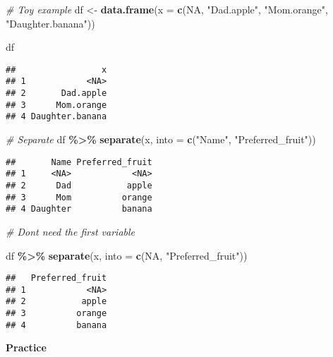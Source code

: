 \documentclass[
]{book}
\newenvironment{Shaded}{\begin{snugshade}}{\end{snugshade}}
\newcommand{\CommentTok}[1]{\textcolor[rgb]{0.56,0.35,0.01}{\textit{#1}}}
\newcommand{\DataTypeTok}[1]{\textcolor[rgb]{0.13,0.29,0.53}{#1}}
\newcommand{\KeywordTok}[1]{\textcolor[rgb]{0.13,0.29,0.53}{\textbf{#1}}}
\newcommand{\NormalTok}[1]{#1}
\newcommand{\OperatorTok}[1]{\textcolor[rgb]{0.81,0.36,0.00}{\textbf{#1}}}
\newcommand{\OtherTok}[1]{\textcolor[rgb]{0.56,0.35,0.01}{#1}}
\newcommand{\StringTok}[1]{\textcolor[rgb]{0.31,0.60,0.02}{#1}}
\begin{document}
\begin{Shaded}
\begin{Highlighting}[]
\CommentTok{\# Toy example}
\NormalTok{df \textless{}{-}}\StringTok{ }\KeywordTok{data.frame}\NormalTok{(}\DataTypeTok{x =} \KeywordTok{c}\NormalTok{(}\OtherTok{NA}\NormalTok{, }\StringTok{"Dad.apple"}\NormalTok{, }\StringTok{"Mom.orange"}\NormalTok{, }\StringTok{"Daughter.banana"}\NormalTok{))}

\NormalTok{df}
\end{Highlighting}
\end{Shaded}

\begin{verbatim}
##                 x
## 1            <NA>
## 2       Dad.apple
## 3      Mom.orange
## 4 Daughter.banana
\end{verbatim}

\begin{Shaded}
\begin{Highlighting}[]
\CommentTok{\# Separate}
\NormalTok{df }\OperatorTok{\%\textgreater{}\%}
\StringTok{  }\KeywordTok{separate}\NormalTok{(x, }\DataTypeTok{into =} \KeywordTok{c}\NormalTok{(}\StringTok{"Name"}\NormalTok{, }\StringTok{"Preferred\_fruit"}\NormalTok{))}
\end{Highlighting}
\end{Shaded}

\begin{verbatim}
##       Name Preferred_fruit
## 1     <NA>            <NA>
## 2      Dad           apple
## 3      Mom          orange
## 4 Daughter          banana
\end{verbatim}

\begin{Shaded}
\begin{Highlighting}[]
\CommentTok{\# Don\textquotesingle{}t need the first variable}

\NormalTok{df }\OperatorTok{\%\textgreater{}\%}
\StringTok{  }\KeywordTok{separate}\NormalTok{(x, }\DataTypeTok{into =} \KeywordTok{c}\NormalTok{(}\OtherTok{NA}\NormalTok{, }\StringTok{"Preferred\_fruit"}\NormalTok{))}
\end{Highlighting}
\end{Shaded}

\begin{verbatim}
##   Preferred_fruit
## 1            <NA>
## 2           apple
## 3          orange
## 4          banana
\end{verbatim}

\textbf{Practice}
\end{document}
